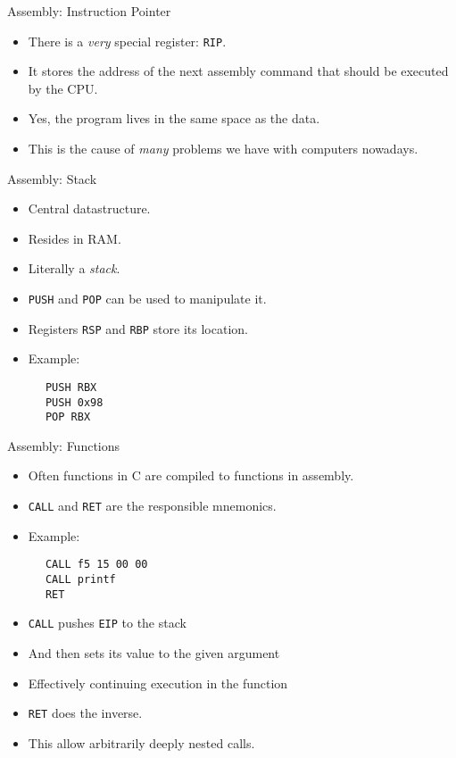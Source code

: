\documentclass{beamer}
\begin{document}
  \begin{frame}[fragile]{Assembly: Instruction Pointer}\pause
    \begin{itemize}
      \item There is a \emph{very} special register: \verb|RIP|.\pause
      \item It stores the address of the next assembly command that should be executed by the CPU.\pause
      \item Yes, the program lives in the same space as the data.\pause
      \item This is the cause of \emph{many} problems we have with computers nowadays.\pause
    \end{itemize}
  \end{frame}

  \begin{frame}[fragile]{Assembly: Stack}\pause
    \begin{itemize}
      \item Central datastructure.\pause
      \item Resides in RAM.\pause
      \item Literally a \emph{stack}.\pause
      \item \verb|PUSH| and \verb|POP| can be used to manipulate it.\pause
      \item Registers \verb|RSP| and \verb|RBP| store its location.\pause
      \item Example:\pause
    \end{itemize}
    \begin{lstlisting}
      PUSH RBX
      PUSH 0x98
      POP RBX
    \end{lstlisting}
  \end{frame}

  \begin{frame}[fragile]{Assembly: Functions}\pause
    \begin{itemize}
      \item Often functions in C are compiled to functions in assembly.\pause
      \item \verb|CALL| and \verb|RET| are the responsible mnemonics.\pause
      \item Example:\pause
    \end{itemize}
    \begin{lstlisting}
      CALL f5 15 00 00
      CALL printf
      RET
    \end{lstlisting}
    \pause
    \begin{itemize}
      \item \verb|CALL| pushes \verb|EIP| to the stack\pause
      \item And then sets its value to the given argument\pause
      \item Effectively continuing execution in the function\pause
      \item \verb|RET| does the inverse.\pause
      \item This allow arbitrarily deeply nested calls.
    \end{itemize}
  \end{frame}
\end{document}
